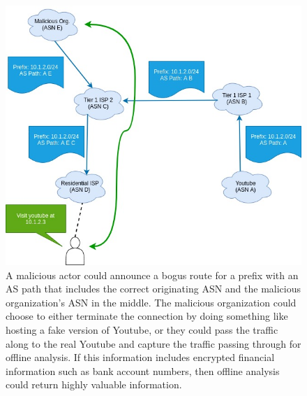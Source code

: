\documentclass[conference]{IEEEtran}
\begin{document}
\begin{figure}
  \includegraphics[width=\linewidth]{images/bgp-intercept.jpg}
  \caption{A malicious actor could announce a bogus route for a prefix with an AS path that includes the correct originating ASN and the malicious organization's ASN in the middle.  The malicious organization could choose to either terminate the connection by doing something like hosting a fake version of Youtube, or they could pass the traffic along to the real Youtube and capture the traffic passing through for offline analysis.  If this information includes encrypted financial information such as bank account numbers, then offline analysis could return highly valuable information.}
  \label{fig:bgp-intercept}
\end{figure}
\end{document}
